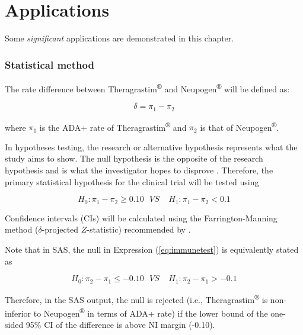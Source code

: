 \documentclass[]{book}
\begin{document}
\chapter{Applications}\label{applications}

Some \emph{significant} applications are demonstrated in this chapter.

\subsection{Statistical method}\label{statistical-method}

The rate difference between Theragrastim\textsuperscript{®} and
Neupogen\textsuperscript{®} will be defined as:

\begin{equation}\label{eq:adadiff}
\delta = \pi_1 -\pi_2
\end{equation}

where \(\pi_1\) is the ADA+ rate of Theragrastim\textsuperscript{®} and
\(\pi_2\) is that of Neupogen\textsuperscript{®}.

In hypotheses testing, the research or alternative hypothesis represents
what the study aims to show. The null hypothesis is the opposite of the
research hypothesis and is what the investigator hopes to disprove
\citep{walker2011understanding}. Therefore, the primary statistical
hypothesis for the clinical trial will be tested using

\begin{equation}\label{eq:immunetest}
H_0: \pi_1 - \pi_2 \geq 0.10~~~  VS~~~~~ H_1: \pi_1 - \pi_2 < 0.1
\end{equation}

Confidence intervals (CIs) will be calculated using the
Farrington-Manning method (\(\delta\)-projected \(Z\)-statistic)
recommended by \citet{chan1999test}.

Note that in SAS, the null in Expression (\ref{eq:immunetest}) is
equivalently stated as

\begin{equation}\label{eq:immunetest2}
H_0: \pi_2 - \pi_1 \leq -0.10~~~  VS~~~~~ H_1: \pi_2 - \pi_1 > -0.1
\end{equation}

Therefore, in the SAS output, the null is rejected (i.e.,
Theragrastim\textsuperscript{®} is non-inferior to
Neupogen\textsuperscript{®} in terms of ADA+ rate) if the lower bound of
the one-sided 95\% CI of the difference is above NI margin (-0.10).
\end{document}
